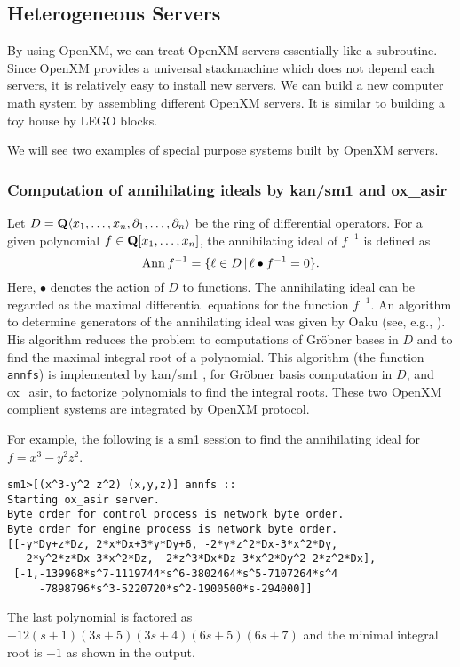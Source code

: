 
\subsection{Heterogeneous Servers}

\def\pd#1{ \partial_{#1} }

By using OpenXM, we can treat OpenXM servers essentially 
like a subroutine.
Since OpenXM provides a universal stackmachine which does not
depend each servers, 
it is relatively easy to install new servers.
We can build a new computer math system by assembling
different OpenXM servers.
It is similar to building a toy house by LEGO blocks.

We will see two examples of special purpose systems
built by OpenXM servers.

\subsubsection{Computation of annihilating ideals by kan/sm1 and ox\_asir}

Let $D = {\bf Q} \langle x_1, \ldots, x_n , \pd{1}, \ldots, \pd{n} \rangle$
be the ring of differential operators.
For a given polynomial
$ f \in {\bf Q}[x_1, \ldots, x_n] $,
the annihilating ideal of $f^{-1}$ is defined as
$$ {\rm Ann}\, f^{-1} = \{ \ell \in D \,|\,
  \ell \bullet f^{-1} = 0 \}.
$$
Here, $\bullet$ denotes the action of $D$ to functions.
The annihilating ideal can be regarded as the maximal differential
equations for the function $f^{-1}$.
An algorithm to determine generators of the annihilating ideal
was given by Oaku (see, e.g., \cite[5.3]{sst-book}).
His algorithm reduces the problem to computations of Gr\"obner bases
in $D$ and to find the maximal integral root of a polynomial.
This algorithm (the function {\tt annfs}) is implemented by
kan/sm1 \cite{kan}, for Gr\"obner basis computation in $D$, and
ox\_asir, to factorize polynomials to find the integral
roots.
These two OpenXM complient systems are integrated by
OpenXM protocol.

For example, the following is a sm1 session to find the annihilating
ideal for $f = x^3 - y^2 z^2$.
\begin{verbatim}
sm1>[(x^3-y^2 z^2) (x,y,z)] annfs ::
Starting ox_asir server.
Byte order for control process is network byte order.
Byte order for engine process is network byte order.
[[-y*Dy+z*Dz, 2*x*Dx+3*y*Dy+6, -2*y*z^2*Dx-3*x^2*Dy, 
  -2*y^2*z*Dx-3*x^2*Dz, -2*z^3*Dx*Dz-3*x^2*Dy^2-2*z^2*Dx], 
 [-1,-139968*s^7-1119744*s^6-3802464*s^5-7107264*s^4
     -7898796*s^3-5220720*s^2-1900500*s-294000]] 
\end{verbatim}
The last polynomial is factored as
$-12(s+1)(3s+5)(3s+4)(6s+5)(6s+7)$
and the minimal integral root is $-1$
as shown in the output.

